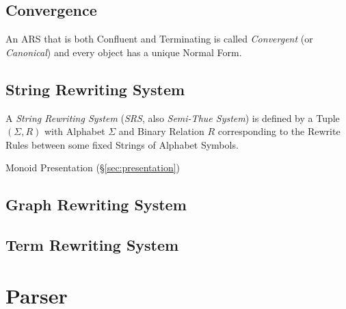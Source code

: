 \subsection{Convergence}\label{sec:rewrite_convergence}

An ARS that is both Confluent and Terminating is called
\emph{Convergent} (or \emph{Canonical}) and every object has a unique
Normal Form.



\subsection{String Rewriting System}\label{sec:string_rewriting}

A \emph{String Rewriting System} (\emph{SRS}, also \emph{Semi-Thue
  System}) is defined by a Tuple $(\Sigma, R)$ with Alphabet $\Sigma$
and Binary Relation $R$ corresponding to the Rewrite Rules between
some fixed Strings of Alphabet Symbols.

Monoid Presentation (\S\ref{sec:presentation})



\subsection{Graph Rewriting System}\label{sec:graph_rewriting}

\subsection{Term Rewriting System}\label{sec:term_rewriting}



\section{Parser} \label{sec:parser}

